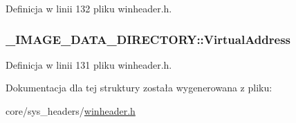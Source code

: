 Definicja w linii 132 pliku winheader.\-h.

\hypertarget{struct___i_m_a_g_e___d_a_t_a___d_i_r_e_c_t_o_r_y_a4367862469fd1ea60088ae02b1b6df70}{
\subsubsection[{Virtual\-Address}]{ \-\_\-\-I\-M\-A\-G\-E\-\_\-\-D\-A\-T\-A\-\_\-\-D\-I\-R\-E\-C\-T\-O\-R\-Y\-::\-Virtual\-Address}}\label{struct___i_m_a_g_e___d_a_t_a___d_i_r_e_c_t_o_r_y_a4367862469fd1ea60088ae02b1b6df70}


Definicja w linii 131 pliku winheader.\-h.



Dokumentacja dla tej struktury została wygenerowana z pliku\-:\begin{DoxyCompactItemize}
\item 
core/sys\-\_\-headers/\hyperlink{winheader_8h}{winheader.\-h}\end{DoxyCompactItemize}
